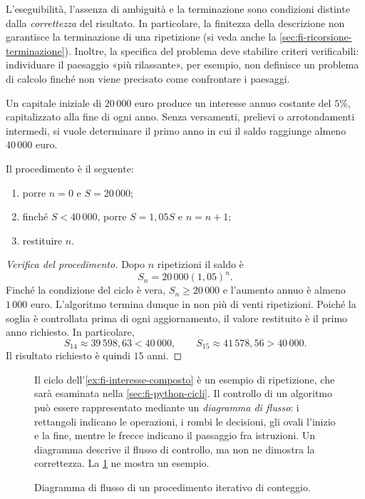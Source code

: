 L'eseguibilità, l'assenza di ambiguità e la terminazione sono condizioni
distinte dalla \emph{correttezza} del risultato. In particolare, la
finitezza della descrizione non garantisce la terminazione di una
ripetizione (si veda anche la \cref{sec:fi-ricorsione-terminazione}).
Inoltre, la specifica del problema deve stabilire criteri
verificabili: individuare il paesaggio «più rilassante», per esempio,
non definisce un problema di calcolo finché non viene precisato
come confrontare i paesaggi.

\clearpage

\begin{example}
\label{ex:fi-interesse-composto}
Un capitale iniziale di \(20\,000\) euro produce un interesse annuo
costante del \(5\%\), capitalizzato alla fine di ogni anno. Senza
versamenti, prelievi o arrotondamenti intermedi, si vuole determinare
il primo anno in cui il saldo raggiunge almeno \(40\,000\) euro.

Il procedimento è il seguente:
\begin{enumerate}
  \item porre \(n=0\) e \(S=20\,000\);
  \item finché \(S<40\,000\), porre \(S=1{,}05S\) e \(n=n+1\);
  \item restituire \(n\).
\end{enumerate}
\end{example}

\begin{proof}[Verifica del procedimento]
Dopo \(n\) ripetizioni il saldo è
\[
  S_n=20\,000(1{,}05)^n.
\]
Finché la condizione del ciclo è vera, \(S_n\ge20\,000\) e l'aumento
annuo è almeno \(1\,000\) euro. L'algoritmo termina dunque in non più
di venti ripetizioni. Poiché la soglia è controllata prima di ogni
aggiornamento, il valore restituito è il primo anno richiesto.
In particolare,
\[
  S_{14}\approx39\,598{,}63<40\,000,
  \qquad
  S_{15}\approx41\,578{,}56>40\,000.
\]
Il risultato richiesto è quindi \(15\) anni.
\end{proof}

\begin{figure}[htbp]
  \begin{minipage}[c]{0.57\textwidth}
    Il ciclo dell'\cref{ex:fi-interesse-composto} è un esempio di
    ripetizione, che sarà esaminata nella \cref{sec:fi-python-cicli}.
    Il controllo di un algoritmo può essere rappresentato mediante un
    \emph{diagramma di flusso}: i rettangoli indicano le operazioni, i
    rombi le decisioni, gli ovali l'inizio e la fine, mentre le frecce
    indicano il passaggio fra istruzioni. Un diagramma descrive il flusso
    di controllo, ma non ne dimostra la correttezza. La
    \cref{fig:fi-diagramma-conteggio} ne mostra un esempio.
  \end{minipage}
  \hfill
  \begin{minipage}[c]{0.32\textwidth}
    \centering
    \resizebox{0.85\linewidth}{!}{%
    }
    \caption{Diagramma di flusso di un procedimento iterativo di conteggio.}
    \label{fig:fi-diagramma-conteggio}
  \end{minipage}
\end{figure}

